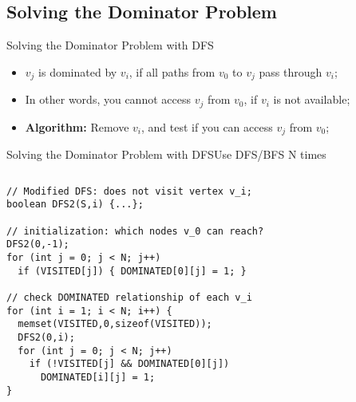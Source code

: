 \subsection{Solving the Dominator Problem}

\begin{frame}[fragile]{Solving the Dominator Problem with DFS}
  \begin{exampleblock}{}
    \begin{itemize}
      \item $v_j$ is dominated by $v_i$, if all paths from $v_0$ to $v_j$ pass through $v_i$;
      \item In other words, you cannot access $v_j$ from $v_0$, if $v_i$ is not available;
      \item {\bf Algorithm:} Remove $v_i$, and test if you can access $v_j$ from $v_0$;
    \end{itemize}
  \end{exampleblock}\bigskip

  
\end{frame}

\begin{frame}[fragile]{Solving the Dominator Problem with DFS}{Use DFS/BFS N times}

  \begin{columns}
    

    \begin{exampleblock}{}
{\smaller
\begin{verbatim}
// Modified DFS: does not visit vertex v_i;
boolean DFS2(S,i) {...};

// initialization: which nodes v_0 can reach?
DFS2(0,-1);
for (int j = 0; j < N; j++)
  if (VISITED[j]) { DOMINATED[0][j] = 1; }

// check DOMINATED relationship of each v_i
for (int i = 1; i < N; i++) {
  memset(VISITED,0,sizeof(VISITED));
  DFS2(0,i);
  for (int j = 0; j < N; j++)
    if (!VISITED[j] && DOMINATED[0][j])
      DOMINATED[i][j] = 1;
}
\end{verbatim}}
    \end{exampleblock}
  \end{columns}
\end{frame}



